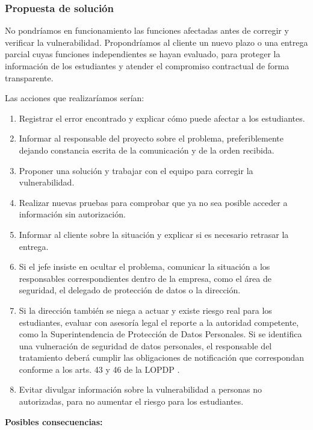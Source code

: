 \documentclass[12pt,a4paper,oneside]{article}
\newcommand{\rotulo}[1]{\par\Needspace{5\baselineskip}\noindent\textbf{#1}\par\nobreak}
\newcommand{\citaa}[2]{\cite{#1,#2}}
\begin{document}
\subsubsection{Propuesta de solución}

No pondríamos en funcionamiento las funciones afectadas antes de corregir y verificar la vulnerabilidad. Propondríamos al cliente un nuevo plazo o una entrega parcial cuyas funciones independientes se hayan evaluado, para proteger la información de los estudiantes y atender el compromiso contractual de forma transparente.

Las acciones que realizaríamos serían:

\begin{enumerate}[leftmargin=1.8em,itemsep=3pt]
    \item Registrar el error encontrado y explicar cómo puede afectar a los estudiantes.
    \item Informar al responsable del proyecto sobre el problema, preferiblemente dejando constancia escrita de la comunicación y de la orden recibida.
    \item Proponer una solución y trabajar con el equipo para corregir la vulnerabilidad.
    \item Realizar nuevas pruebas para comprobar que ya no sea posible acceder a información sin autorización.
    \item Informar al cliente sobre la situación y explicar si es necesario retrasar la entrega.
    \item Si el jefe insiste en ocultar el problema, comunicar la situación a los responsables correspondientes dentro de la empresa, como el área de seguridad, el delegado de protección de datos o la dirección.
    \item Si la dirección también se niega a actuar y existe riesgo real para los estudiantes, evaluar con asesoría legal el reporte a la autoridad competente, como la Superintendencia de Protección de Datos Personales. Si se identifica una vulneración de seguridad de datos personales, el responsable del tratamiento deberá cumplir las obligaciones de notificación que correspondan conforme a los arts. 43 y 46 de la LOPDP \citaa{ref:lopdp}{ref:ciber}.
    \item Evitar divulgar información sobre la vulnerabilidad a personas no autorizadas, para no aumentar el riesgo para los estudiantes.
\end{enumerate}

\rotulo{Posibles consecuencias:}
\end{document}
